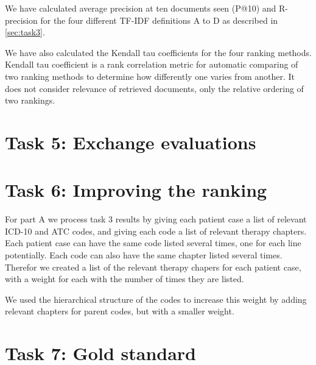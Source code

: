 We have calculated average precision at ten documents seen (P@10) and
R-precision for the four different TF-IDF definitions A to D as described in
\autoref{sec:task3}.

We have also calculated the Kendall tau coefficients for the four ranking
methods. Kendall tau coefficient is a rank correlation metric for automatic
comparing of two ranking methods to determine how differently one varies from
another. It does not consider relevance of retrieved documents, only the
relative ordering of two rankings.


\section{Task 5: Exchange evaluations}


\section{Task 6: Improving the ranking}
For part A we process task 3 results by giving each patient case a list of
relevant ICD-10 and ATC codes, and giving each code a list of relevant therapy
chapters. Each patient case can have the same code listed several times, one
for each line potentially. Each code can also have the same chapter listed
several times. Therefor we created a list of the relevant therapy chapers for
each patient case, with a weight for each with the number of times they are
listed.

We used the hierarchical structure of the codes to increase this weight by
adding relevant chapters for parent codes, but with a smaller weight.




\section{Task 7: Gold standard}


